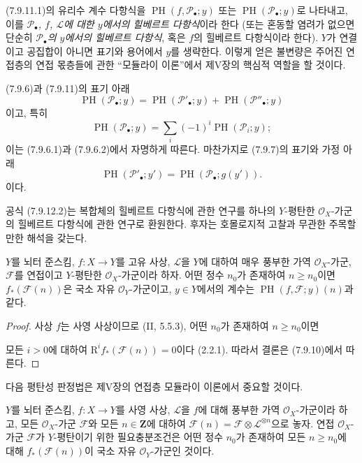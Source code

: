 \begin{env}[7.9.12]
\label{III.7.9.12.fr}
(7.9.11.1)의 유리수 계수 다항식을
$\operatorname{PH}(f,\mathscr P_\bullet;y)$ 또는
$\operatorname{PH}(\mathscr P_\bullet;y)$로 나타내고, 이를
\emph{$\mathscr P_\bullet$, $f$, $\mathscr L$에 대한 $y$에서의
힐베르트 다항식}이라 한다 (또는 혼동할 염려가 없으면 단순히
\emph{$\mathscr P_\bullet$의 $y$에서의 힐베르트 다항식}, 혹은 $f$의
힐베르트 다항식이라 한다). $Y$가 연결이고 공집합이 아니면 표기와
용어에서 $y$를 생략한다. 이렇게 얻은 불변량은 주어진 연접층의 연접
몫층들에 관한 “모듈라이 이론”에서 제V장의 핵심적 역할을 할 것이다.

(7.9.6)과 (7.9.11)의 표기 아래
\[
  \operatorname{PH}(\mathscr P_\bullet;y)
  =\operatorname{PH}(\mathscr P'_\bullet;y)
  +\operatorname{PH}(\mathscr P''_\bullet;y)
  \tag{7.9.12.1}\label{III.7.9.12.1.fr}
\]
이고, 특히
\[
  \operatorname{PH}(\mathscr P_\bullet;y)
  =\sum_i(-1)^i\operatorname{PH}(\mathscr P_i;y) ;
  \tag{7.9.12.2}\label{III.7.9.12.2.fr}
\]
이는 (7.9.6.1)과 (7.9.6.2)에서 자명하게 따른다. 마찬가지로 (7.9.7)의
표기와 가정 아래
\[
  \operatorname{PH}(\mathscr P'_\bullet;y')
  =\operatorname{PH}(\mathscr P_\bullet;g(y')).
  \tag{7.9.12.3}\label{III.7.9.12.3.fr}
\]
이다.
\end{env}

공식 (7.9.12.2)는 복합체의 힐베르트 다항식에 관한 연구를 하나의
$Y$-평탄한 $\mathscr O_X$-가군의 힐베르트 다항식에 관한 연구로
환원한다. 후자는 호몰로지적 고찰과 무관한 주목할 만한 해석을 갖는다.

\begin{corollary}[7.9.13]
\label{III.7.9.13.fr}
$Y$를 뇌터 준스킴, $f:X\to Y$를 고유 사상, $\mathscr L$을 $Y$에
대하여 매우 풍부한 가역 $\mathscr O_X$-가군, $\mathscr F$를 연접이고
$Y$-평탄한 $\mathscr O_X$-가군이라 하자. 어떤 정수 $n_0$가 존재하여
$n\geq n_0$이면 $f_*(\mathscr F(n))$은 국소 자유
$\mathscr O_Y$-가군이고, $y\in Y$에서의 계수는
$\operatorname{PH}(f,\mathscr F;y)(n)$과 같다.
\end{corollary}

\begin{proof}
사상 $f$는 사영 사상이므로 (II, 5.5.3), 어떤 $n_0$가 존재하여
$n\geq n_0$이면

모든 $i>0$에 대하여 $\mathrm R^if_*(\mathscr F(n))=0$이다 (2.2.1).
따라서 결론은 (7.9.10)에서 따른다.
\end{proof}


다음 평탄성 판정법은 제V장의 연접층 모듈라이 이론에서 중요할 것이다.

\begin{proposition}[7.9.14]
\label{III.7.9.14.fr}
$Y$를 뇌터 준스킴, $f:X\to Y$를 사영 사상, $\mathscr L$을 $f$에 대해
풍부한 가역 $\mathscr O_X$-가군이라 하고, 모든 $\mathscr O_X$-가군
$\mathscr F$와 모든 $n\in\mathbf Z$에 대하여
$\mathscr F(n)=\mathscr F\otimes\mathscr L^{\otimes n}$으로 놓자. 연접
$\mathscr O_X$-가군 $\mathscr F$가 $Y$-평탄이기 위한 필요충분조건은
어떤 정수 $n_0$가 존재하여 모든 $n\geq n_0$에 대해
$f_*(\mathscr F(n))$이 국소 자유 $\mathscr O_Y$-가군인 것이다.
\end{proposition}

